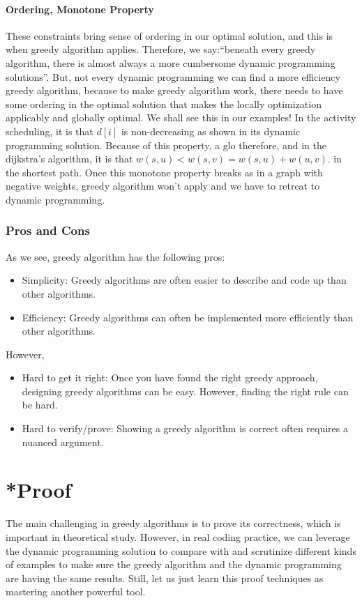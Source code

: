 \documentclass[../main.tex]{subfiles}
\begin{document}
\paragraph{Ordering, Monotone Property} These constraints bring sense of ordering in our optimal solution, and this is when greedy algorithm applies. Therefore, we say:``beneath every greedy algorithm, there is almost always a more cumbersome dynamic programming solutions''. But, not every dynamic programming we can find a more efficiency greedy algorithm, because to make greedy algorithm work, there needs to have some ordering in the optimal solution that makes the locally optimization applicably and globally optimal. We shall see this in our examples! In the activity scheduling, it is that $d[i]$ is non-decreasing as shown in its dynamic programming solution. Because of this property, a glo therefore, and in the dijkstra's algorithm, it is that $w(s, u) < w(s, v) = w(s, u) + w(u, v)$.  in the shortest path. Once this monotone property breaks as in a graph with negative weights, greedy algorithm won't apply and we have to retreat to dynamic programming. 

\subsubsection{Pros and Cons}
As we see, greedy algorithm has the following pros:
\begin{itemize}
    \item     Simplicity: Greedy algorithms are often easier to describe and code up than other algorithms.
    \item Efficiency: Greedy algorithms can often be implemented more efficiently than other algorithms.
\end{itemize}
However, 
\begin{itemize}
    \item Hard to get it right: Once you have found the right greedy approach, designing greedy algorithms can be easy. However, finding the right rule can be hard.
    \item Hard to verify/prove: Showing a greedy algorithm is correct often requires a nuanced argument.
\end{itemize}
\section{*Proof}
The main challenging in greedy algorithms is to prove its correctness, which is important in theoretical study. However, in real coding practice, we can leverage the dynamic programming solution to compare with and scrutinize different kinds of examples to make sure the greedy algorithm and the dynamic programming are having the same results. Still, let us just learn this proof techniques as mastering another powerful tool. 
\end{document}

